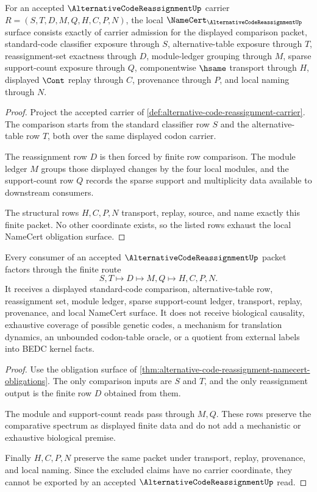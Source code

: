 \begin{theorem}
\label{thm:alternative-code-reassignment-namecert-obligations}
For an accepted $\AlternativeCodeReassignmentUp$ carrier $R=(S,T,D,M,Q,H,C,P,N)$, the local $\NameCert_{\AlternativeCodeReassignmentUp}$ surface consists exactly of carrier admission for the displayed comparison packet, standard-code classifier exposure through $S$, alternative-table exposure through $T$, reassignment-set exactness through $D$, module-ledger grouping through $M$, sparse support-count exposure through $Q$, componentwise $\hsame$ transport through $H$, displayed $\Cont$ replay through $C$, provenance through $P$, and local naming through $N$.
\end{theorem}
\begin{proof}
Project the accepted carrier of \autoref{def:alternative-code-reassignment-carrier}. The comparison starts from the standard classifier row $S$ and the alternative-table row $T$, both over the same displayed codon carrier.

The reassignment row $D$ is then forced by finite row comparison. The module ledger $M$ groups those displayed changes by the four local modules, and the support-count row $Q$ records the sparse support and multiplicity data available to downstream consumers.

The structural rows $H,C,P,N$ transport, replay, source, and name exactly this finite packet. No other coordinate exists, so the listed rows exhaust the local NameCert obligation surface.
\end{proof}

\begin{theorem}
\label{thm:alternative-code-reassignment-spectrum-nonescape}
Every consumer of an accepted $\AlternativeCodeReassignmentUp$ packet factors through the finite route
$$
S,T
\longmapsto
D
\longmapsto
M,Q
\longmapsto
H,C,P,N .
$$
It receives a displayed standard-code comparison, alternative-table row, reassignment set, module ledger, sparse support-count ledger, transport, replay, provenance, and local NameCert surface. It does not receive biological causality, exhaustive coverage of possible genetic codes, a mechanism for translation dynamics, an unbounded codon-table oracle, or a quotient from external labels into BEDC kernel facts.
\end{theorem}
\begin{proof}
Use the obligation surface of \autoref{thm:alternative-code-reassignment-namecert-obligations}. The only comparison inputs are $S$ and $T$, and the only reassignment output is the finite row $D$ obtained from them.

The module and support-count reads pass through $M,Q$. These rows preserve the comparative spectrum as displayed finite data and do not add a mechanistic or exhaustive biological premise.

Finally $H,C,P,N$ preserve the same packet under transport, replay, provenance, and local naming. Since the excluded claims have no carrier coordinate, they cannot be exported by an accepted $\AlternativeCodeReassignmentUp$ read.
\end{proof}

